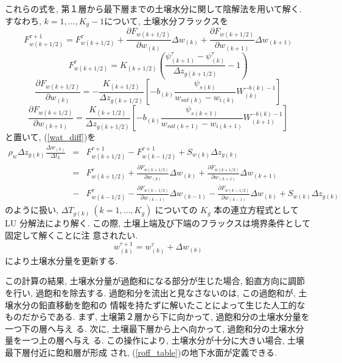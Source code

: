 これらの式を, 第１層から最下層までの土壌水分に関して陰解法を用いて解く.
すなわち, $k=1,\ldots,K_g-1$について, 土壌水分フラックスを
\begin{equation}
  F_{w(k+1/2)}^{\tau+1} = F_{w(k+1/2)}^{\tau}
+\frac{\partial {F}_{w(k+1/2)}}{\partial w_{(k)}}
 \Delta w_{(k)}
+\frac{\partial {F}_{w(k+1/2)}}{\partial w_{(k+1)}}
 \Delta w_{(k+1)}
\end{equation}
\begin{equation}
  F_{w(k+1/2)}^{\tau} =
K_{(k+1/2)} \left(\frac{\psi_{(k+1)}^{\tau} - \psi_{(k)}^{\tau}}{\Delta z_{g(k+1/2)}} - 1 \right)
\end{equation}
\begin{equation}
 \frac{\partial {F}_{w(k+1/2)}}{\partial w_{(k)}} =
- \frac{K_{(k+1/2)}}{\Delta z_{g(k+1/2)}}
\left[
-b_{(k)} \frac{\psi_{s(k)}}{w_{sat(k)}-w_{i(k)}}W_{(k)}^{-b(k)-1}
\right]
\end{equation}
\begin{equation}
 \frac{\partial {F}_{w(k+1/2)}}{\partial w_{(k+1)}} =
 \frac{K_{(k+1/2)}}{\Delta z_{g(k+1/2)}}
\left[
-b_{(k)} \frac{\psi_{s(k+1)}}{w_{sat(k+1)}-w_{i(k+1)}}W_{(k+1)}^{-b(k)-1}
\right]
\end{equation}
と置いて, (\ref{wat_diff})を
\begin{eqnarray}
\rho_w \Delta z_{g(k)} \frac{\Delta w_{(k)}}{\Delta t_L}
&=& F_{w(k+1/2)}^{\tau+1} - {F}_{w(k-1/2)}^{\tau+1} + S_{w(k)} \Delta z_{g(k)} \nonumber \\
&=& {F}_{w(k+1/2)}^{\tau}
+\frac{\partial F_{w(k+1/2)}}{\partial w_{(k)}}
 \Delta w_{(k)}
+\frac{\partial F_{w(k+1/2)}}{\partial w_{(k+1)}}
 \Delta w_{(k+1)} \nonumber \\
&-& F_{w(k-1/2)}^{\tau}
-\frac{\partial F_{w(k-1/2)}}{\partial w_{(k-1)}}
 \Delta w_{(k-1)}
-\frac{\partial F_{w(k-1/2)}}{\partial w_{(k-1)}}
 \Delta w_{(k)} + S_{w(k)} \Delta z_{g(k)}
\end{eqnarray}
のように扱い, $\Delta T_{g(k)}\ (k=1,\ldots,K_{g})$ についての
$K_{g}$ 本の連立方程式として LU 分解法により解く.
この際, 土壌上端及び下端のフラックスは境界条件として固定して解くことに注
意されたい.
\begin{equation}
 w_{(k)}^{\tau+1} = w_{(k)}^{\tau} + \Delta w_{(k)}
\end{equation}
により土壌水分量を更新する.

この計算の結果, 土壌水分量が過飽和になる部分が生じた場合, 鉛直方向に調節
を行い, 過飽和を除去する.
過飽和分を流出と見なさないのは, この過飽和が, 土壌水分の鉛直移動を飽和の
情報を持たずに解いたことによって生じた人工的なものだからである.
まず, 土壌第２層から下に向かって, 過飽和分の土壌水分量を一つ下の層へ与え
る.
次に, 土壌最下層から上へ向かって, 過飽和分の土壌水分量を一つ上の層へ与え
る.
この操作により, 土壌水分が十分に大きい場合, 土壌最下層付近に飽和層が形成
され, (\ref{roff_table})の地下水面が定義できる.

